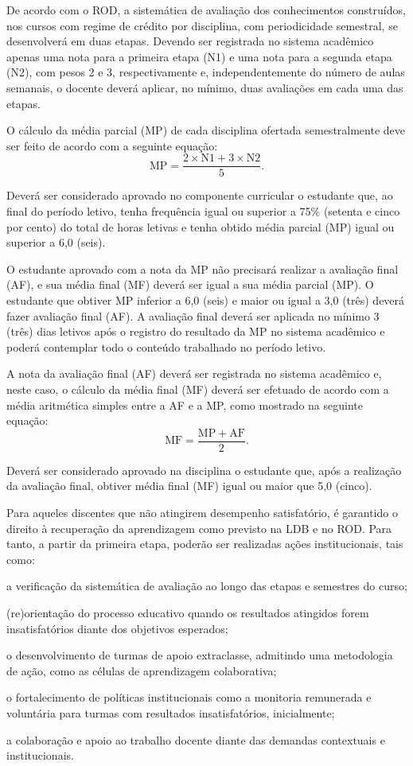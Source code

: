 \documentclass[
	12pt,				%
	openright,			%
	twoside,			%
	a4paper,			%
	chapter=TITLE,		%
	english,			%
	french,				%
	spanish,			%
	brazil,				%
	]{abntex2}
\begin{document}
De acordo com o ROD, a sistemática de avaliação dos conhecimentos construídos, nos cursos com regime de crédito por disciplina, com periodicidade semestral, se desenvolverá em duas etapas. Devendo ser registrada no sistema acadêmico apenas uma nota para a primeira etapa (N1) e uma nota para a segunda etapa (N2), com pesos 2 e 3, respectivamente e, independentemente do número de aulas semanais, o docente deverá aplicar, no mínimo, duas avaliações em cada uma das etapas.

O cálculo da média parcial (MP) de cada disciplina ofertada semestralmente deve ser feito de acordo com a seguinte equação:
\[
    \mathrm{MP} = \frac{2 \times \mathrm{N1} + 3 \times \mathrm{N2}}{5}.
\]

Deverá ser considerado aprovado no componente curricular o estudante que, ao final do período letivo, tenha frequência igual ou superior a 75\% (setenta e cinco por cento) do total de horas letivas e tenha obtido média parcial (MP) igual ou superior a 6,0 (seis). 

O estudante aprovado com a nota da MP não precisará realizar a avaliação final (AF), e sua média final (MF) deverá ser igual a sua média parcial (MP). O estudante que obtiver MP inferior a 6,0 (seis) e maior ou igual a 3,0 (três) deverá fazer avaliação final (AF). A avaliação final deverá ser aplicada no mínimo 3 (três) dias letivos após o registro do resultado da MP no sistema acadêmico e poderá contemplar todo o conteúdo trabalhado no período letivo.

A nota da avaliação final (AF) deverá ser registrada no sistema acadêmico e, neste caso, o cálculo da média final (MF) deverá ser efetuado de acordo com a média aritmética simples entre a AF e a MP, como mostrado na seguinte equação:
\[
    \mathrm{MF} = \frac{ \mathrm{MP} + \mathrm{AF}}{2}.
\]

Deverá ser considerado aprovado na disciplina o estudante que, após a realização da avaliação final, obtiver média final (MF) igual ou maior que 5,0 (cinco).

Para aqueles discentes que não atingirem desempenho satisfatório, é garantido o direito à recuperação da aprendizagem como previsto na LDB e no ROD. Para tanto, a partir da primeira etapa, poderão ser realizadas ações institucionais, tais como:
\begin{alineas}
	\item a verificação da sistemática de avaliação ao longo das etapas e semestres do curso;
 	\item (re)orientação do processo educativo quando os resultados atingidos forem insatisfatórios diante dos objetivos esperados;
 	\item o desenvolvimento de turmas de apoio extraclasse, admitindo uma metodologia de ação, como as células de aprendizagem colaborativa;
 	\item o fortalecimento de políticas institucionais como a monitoria remunerada e voluntária para turmas com resultados insatisfatórios, inicialmente;
 	\item a colaboração e apoio ao trabalho docente diante das demandas contextuais e institucionais.
\end{alineas}
\end{document}
